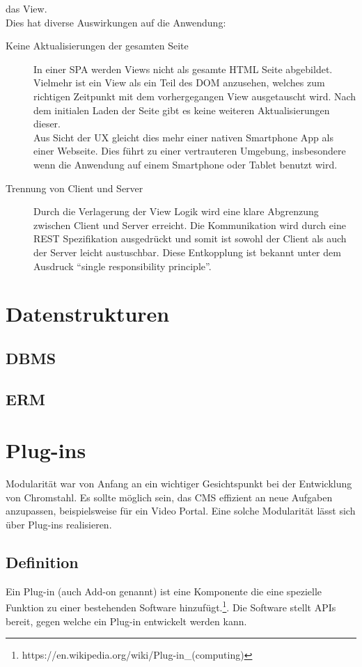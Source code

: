 das View.\\
Dies hat diverse Auswirkungen auf die Anwendung: 
\begin{description}
  \item[Keine Aktualisierungen der gesamten Seite]In einer \ac{SPA} werden Views
    nicht als gesamte \ac{HTML} Seite abgebildet. Vielmehr ist ein View als ein
    Teil des \ac{DOM} anzusehen, welches zum richtigen Zeitpunkt mit dem
    vorhergegangen View ausgetauscht wird. Nach dem initialen Laden der Seite
    gibt es keine weiteren Aktualisierungen dieser.\\
    Aus Sicht der \ac{UX}
    gleicht dies mehr einer nativen Smartphone App als einer Webseite. Dies
    führt zu einer vertrauteren Umgebung, insbesondere wenn die Anwendung auf
    einem Smartphone oder Tablet benutzt wird.
  \item[Trennung von Client und Server]Durch die Verlagerung der
    View Logik wird eine klare Abgrenzung zwischen Client und Server erreicht.
    Die Kommunikation wird durch eine \ac{REST} Spezifikation ausgedrückt und
    somit ist sowohl der Client als auch der Server leicht austuschbar. Diese
    Entkopplung ist bekannt unter dem Ausdruck ``single responsibility principle''\cite{cleancode}.
\end{description}

\section{Datenstrukturen}
\subsection{\acl{DBMS}}
\subsection{\acl{ERM}}
\section{Plug-ins}
Modularität war von Anfang an ein wichtiger Gesichtspunkt bei der Entwicklung
von Chromstahl. Es sollte möglich sein, das \ac{CMS} effizient an neue Aufgaben
anzupassen, beispielsweise für ein Video Portal. Eine solche Modularität lässt
sich über Plug-ins realisieren.
\subsection{Definition}
Ein Plug-in (auch Add-on genannt) ist eine Komponente die eine spezielle
Funktion zu einer bestehenden Software
hinzufügt.\footnote{https://en.wikipedia.org/wiki/Plug-in\_(computing)}. Die
Software stellt \ac{API}s bereit, gegen welche ein Plug-in entwickelt werden kann.
